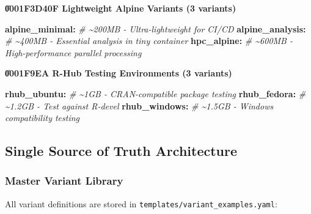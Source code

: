\documentclass[
]{article}
\newenvironment{Shaded}{\begin{snugshade}}{\end{snugshade}}
\newcommand{\CommentTok}[1]{\textcolor[rgb]{0.56,0.35,0.01}{\textit{#1}}}
\newcommand{\FunctionTok}[1]{\textcolor[rgb]{0.13,0.29,0.53}{\textbf{#1}}}
\newcommand{\KeywordTok}[1]{\textcolor[rgb]{0.13,0.29,0.53}{\textbf{#1}}}
\begin{document}
\textbf{\U0001F3D4\uFE0F Lightweight Alpine Variants (3 variants)}

\begin{Shaded}
\begin{Highlighting}[]
\FunctionTok{alpine\_minimal}\KeywordTok{:}\CommentTok{   \# \textasciitilde{}200MB  {-} Ultra{-}lightweight for CI/CD}
\FunctionTok{alpine\_analysis}\KeywordTok{:}\CommentTok{  \# \textasciitilde{}400MB  {-} Essential analysis in tiny container}
\FunctionTok{hpc\_alpine}\KeywordTok{:}\CommentTok{       \# \textasciitilde{}600MB  {-} High{-}performance parallel processing}
\end{Highlighting}
\end{Shaded}

\textbf{\U0001F9EA R-Hub Testing Environments (3 variants)}

\begin{Shaded}
\begin{Highlighting}[]
\FunctionTok{rhub\_ubuntu}\KeywordTok{:}\CommentTok{      \# \textasciitilde{}1GB    {-} CRAN{-}compatible package testing}
\FunctionTok{rhub\_fedora}\KeywordTok{:}\CommentTok{      \# \textasciitilde{}1.2GB  {-} Test against R{-}devel}
\FunctionTok{rhub\_windows}\KeywordTok{:}\CommentTok{     \# \textasciitilde{}1.5GB  {-} Windows compatibility testing}
\end{Highlighting}
\end{Shaded}

\subsection{Single Source of Truth
Architecture}\label{single-source-of-truth-architecture}

\subsubsection{Master Variant Library}\label{master-variant-library}

All variant definitions are stored in
\texttt{templates/variant\_examples.yaml}:
\end{document}

